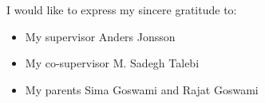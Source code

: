 

\begin{acknowledgement}

I would like to express my sincere gratitude to:

\begin{itemize}
 \item My supervisor Anders Jonsson
 \vspace*{3mm}
 \item My co-supervisor M. Sadegh Talebi
 \vspace*{3mm}
 \item My parents Sima Goswami and Rajat Goswami
 \vspace*{3mm}
\end{itemize}

\newpage
\end{acknowledgement}